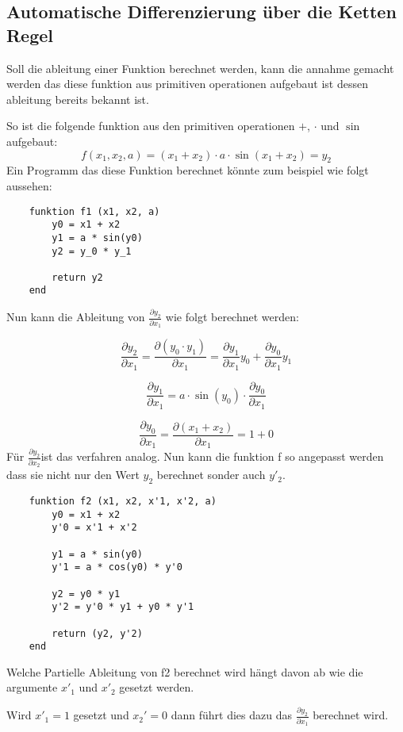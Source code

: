 \subsection{Automatische Differenzierung über die Ketten Regel}

Soll die ableitung einer Funktion berechnet werden, kann die annahme gemacht werden das diese funktion aus primitiven operationen aufgebaut ist dessen ableitung bereits bekannt ist.

So ist die folgende funktion aus den primitiven operationen $+$, $\cdot$  und $\sin$ aufgebaut:
$$
f(x_1, x_2, a) = (x_1 + x_2) \cdot a \cdot \sin(x_1 + x_2) = y_2
$$
Ein Programm das diese Funktion berechnet könnte zum beispiel wie folgt aussehen:

\begin{lstlisting}
    funktion f1 (x1, x2, a)
        y0 = x1 + x2
        y1 = a * sin(y0)
        y2 = y_0 * y_1
        
    	return y2
    end
\end{lstlisting}

Nun kann die Ableitung von $\frac{\partial y_2}{\partial x_1}$ wie folgt berechnet werden:

$$
	\frac{\partial y_2}{\partial x_1} = \frac{\partial (y_0 \cdot y_1)}{\partial x_1} = \frac{\partial  y_1}{\partial x_1} y_0  + \frac{\partial y_0 }{\partial x_1} y_1
$$

$$
	\frac{\partial y_1}{ \partial x_1 } = a \cdot \sin(y_0) \cdot \frac{\partial y_0}{\partial x_1}
$$

$$
	\frac{\partial y_0}{\partial x_1} = \frac{\partial (x_1 + x_2)}{\partial x_1} = 1 + 0
$$Für $\frac{\partial y_2}{\partial x_2}$ist das verfahren analog. 
Nun kann die funktion f so angepasst werden dass sie nicht nur den Wert $y_2$ berechnet sonder auch $y'_2$.

\begin{lstlisting}
    funktion f2 (x1, x2, x'1, x'2, a)
        y0 = x1 + x2
        y'0 = x'1 + x'2

        y1 = a * sin(y0)
        y'1 = a * cos(y0) * y'0

		y2 = y0 * y1
        y'2 = y'0 * y1 + y0 * y'1
        
        return (y2, y'2)
    end
\end{lstlisting}

Welche Partielle Ableitung von f2 berechnet wird hängt davon ab wie die argumente $x'_1$ und $x'_2$ gesetzt werden.

Wird $x'_1 = 1$ gesetzt und $x_2' = 0$ dann führt dies dazu das $\frac{\partial y_2}{\partial x_1}$ berechnet wird.

